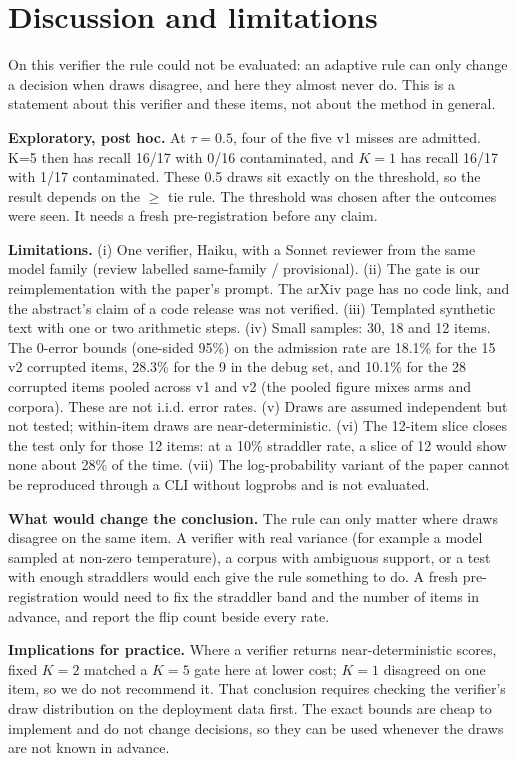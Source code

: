 \documentclass[11pt]{article}
\begin{document}
\section{Discussion and limitations}
On this verifier the rule could not be evaluated: an adaptive rule can only change a decision when draws disagree, and here they almost never do. This is a statement about this verifier and these items, not about the method in general.

\textbf{Exploratory, post hoc.} At $\tau{=}0.5$, four of the five v1 misses are admitted. K=5 then has recall 16/17 with 0/16 contaminated, and $K{=}1$ has recall 16/17 with 1/17 contaminated. These 0.5 draws sit exactly on the threshold, so the result depends on the $\ge$ tie rule. The threshold was chosen after the outcomes were seen. It needs a fresh pre-registration before any claim.

\textbf{Limitations.} (i) One verifier, Haiku, with a Sonnet reviewer from the same model family (review labelled same-family / provisional). (ii) The gate is our reimplementation with the paper's prompt. The arXiv page has no code link, and the abstract's claim of a code release was not verified. (iii) Templated synthetic text with one or two arithmetic steps. (iv) Small samples: 30, 18 and 12 items. The 0-error bounds (one-sided 95\%) on the admission rate are 18.1\% for the 15 v2 corrupted items, 28.3\% for the 9 in the debug set, and 10.1\% for the 28 corrupted items pooled across v1 and v2 (the pooled figure mixes arms and corpora). These are not i.i.d. error rates. (v) Draws are assumed independent but not tested; within-item draws are near-deterministic. (vi) The 12-item slice closes the test only for those 12 items: at a 10\% straddler rate, a slice of 12 would show none about 28\% of the time. (vii) The log-probability variant of the paper cannot be reproduced through a CLI without logprobs and is not evaluated.

\textbf{What would change the conclusion.} The rule can only matter where draws disagree on the same item. A verifier with real variance (for example a model sampled at non-zero temperature), a corpus with ambiguous support, or a test with enough straddlers would each give the rule something to do. A fresh pre-registration would need to fix the straddler band and the number of items in advance, and report the flip count beside every rate.

\textbf{Implications for practice.} Where a verifier returns near-deterministic scores, fixed $K{=}2$ matched a $K{=}5$ gate here at lower cost; $K{=}1$ disagreed on one item, so we do not recommend it. That conclusion requires checking the verifier's draw distribution on the deployment data first. The exact bounds are cheap to implement and do not change decisions, so they can be used whenever the draws are not known in advance.
\end{document}
